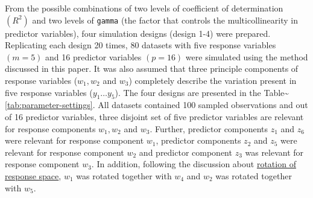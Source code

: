 \documentclass[num-refs]{wiley-article}
\begin{document}
From the possible combinations of two levels of coefficient of
determination \((R^2)\) and two levels of \texttt{gamma} (the factor
that controls the multicollinearity in predictor variables), four
simulation designs (design 1-4) were prepared. Replicating each design
20 times, 80 datasets with five response variables \((m=5)\) and 16
predictor variables \((p = 16)\) were simulated using the method
discussed in this paper. It was also assumed that three principle
components of response variables (\(w_1, w_2\) and \(w_3\)) completely
describe the variation present in five response variables
(\(y_1 \ldots y_5\)). The four designs are presented in the
Table\textasciitilde{}\ref{tab:parameter-settings}. All datasets
contained 100 sampled observations and out of 16 predictor variables,
three disjoint set of five predictor variables are relevant for response
components \(w_1, w_2\) and \(w_3\). Further, predictor components
\(z_1\) and \(z_6\) were relevant for response component \(w_1\),
predictor components \(z_2\) and \(z_5\) were relevant for response
component \(w_2\) and predictor component \(z_3\) was relevant for
response component \(w_3\). In addition, following the discussion about
\protect\hyperlink{rotation-of-response-space}{rotation of response
space}, \(w_1\) was rotated together with \(w_4\) and \(w_2\) was
rotated together with \(w_5\).
\end{document}
